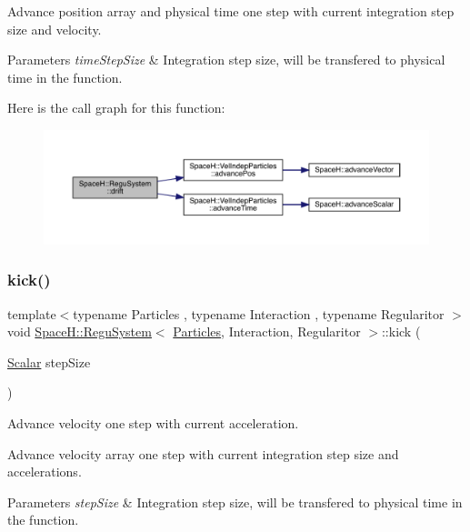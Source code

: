 Advance position array and physical time one step with current integration step size and velocity. 
\begin{DoxyParams}{Parameters}
{\em time\+Step\+Size} & Integration step size, will be transfered to physical time in the function. \\
\hline
\end{DoxyParams}
Here is the call graph for this function\+:
\nopagebreak
\begin{figure}[H]
\begin{center}
\leavevmode
\includegraphics[width=350pt]{class_space_h_1_1_regu_system_a96230f1b7cda19c0605e1148252ec7ae_cgraph}
\end{center}
\end{figure}
\mbox{\label{class_space_h_1_1_regu_system_a6f395fb438f86a8da6fbd1c7c8903cc4}} 
\subsubsection{\texorpdfstring{kick()}{kick()}}
{\footnotesize\ttfamily template$<$typename Particles , typename Interaction , typename Regularitor $>$ \\
void \mbox{\hyperlink{class_space_h_1_1_regu_system}{Space\+H\+::\+Regu\+System}}$<$ \mbox{\hyperlink{struct_space_h_1_1_particles}{Particles}}, Interaction, Regularitor $>$\+::kick (\begin{DoxyParamCaption}\item[{\mbox{\hyperlink{class_space_h_1_1_regu_system_a6f6c4d4fd030a85621a78b137c0ac889}{Scalar}}}]{step\+Size }\end{DoxyParamCaption})\hspace{0.3cm}{\ttfamily [inline]}}



Advance velocity one step with current acceleration. 

Advance velocity array one step with current integration step size and accelerations. 
\begin{DoxyParams}{Parameters}
{\em step\+Size} & Integration step size, will be transfered to physical time in the function. \\
\hline
\end{DoxyParams}
\mbox{\label{class_space_h_1_1_regu_system_a94017190fb2ab31159e27fcbfd105c7b}} 
